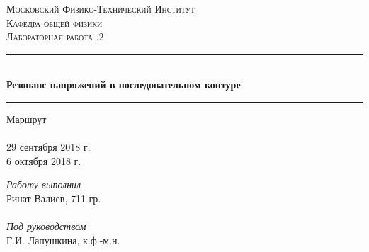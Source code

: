 \begin{titlepage}

\pagestyle{empty}

\begin{center}
	\textsc{\LARGE Московский Физико-Технический Институт}\\[1,5cm]
	\textsc{\Large Кафедра общей физики}\\[0,5cm]
	\textsc{\large Лабораторная работа .2}\\[2.5cm]

	\noindent\rule{\textwidth}{1pt}
	\\[0.5cm]
	{ \huge \bfseries Резонанс напряжений в последовательном контуре}
	\\[0.1cm]
	\noindent\rule{\textwidth}{1pt}
\end{center}

\vfill

\begin{minipage}[b]{0.3\textwidth}
	Маршрут \\\\
	29 сентября 2018 г.\\
	6 октября 2018 г.
\end{minipage}
\hfill
\begin{minipage}[b]{0.33\textwidth}
	\textit{Работу выполнил}\\
	Ринат Валиев, 711 гр.\\\\
	\textit{Под руководством}\\
	Г.И. Лапушкина, к.ф.-м.н.
\end{minipage}

\end{titlepage}

\pagestyle{VR}
\setcounter{page}{2}